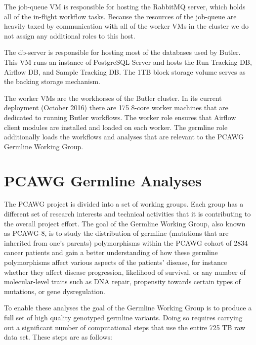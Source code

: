 The job-queue VM is responsible for hosting the RabbitMQ server, which holds all of the in-flight workflow tasks. Because the resources of the job-queue are heavily taxed by communication with all of the worker VMs in the cluster we do not assign any additional roles to this host.

The db-server is responsible for hosting most of the databases used by Butler. This VM runs an instance of PostgreSQL Server and hosts the Run Tracking DB, Airflow DB, and Sample Tracking DB. The 1TB block storage volume serves as the backing storage mechanism. 

The worker VMs are the workhorses of the Butler cluster. In its current deployment (October 2016) there are 175 8-core worker machines that are dedicated to running Butler workflows. The worker role ensures that Airflow client modules are installed and loaded on each worker. The germline role additionally loads the workflows and analyses that are relevant to the PCAWG Germline Working Group. 


\section{PCAWG Germline Analyses}

The PCAWG project is divided into a set of working groups. Each group has a different set of research interests and technical activities that it is contributing to the overall project effort.  The goal of the Germline Working Group, also known as PCAWG-8, is to study the distribution of germline (mutations that are inherited from one's parents) polymorphisms within the PCAWG cohort of 2834 cancer patients and gain a better understanding of how these germline polymorphisms affect various aspects of the patients' disease, for instance whether they affect disease progression, likelihood of survival, or any number of molecular-level traits such as DNA repair, propensity towards certain types of mutations, or gene dysregulation.

To enable these analyses the goal of the Germline Working Group is to produce a full set of high quality genotyped germline variants. Doing so requires carrying out a significant number of computational steps that use the entire 725 TB raw data set. These steps are as follows:

